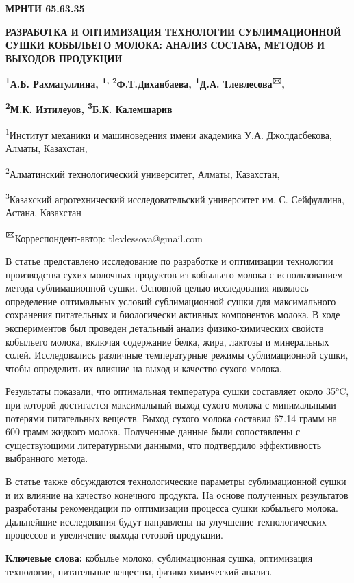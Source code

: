 \newpage
{\bfseries МРНТИ 65.63.35}

{\bfseries РАЗРАБОТКА И ОПТИМИЗАЦИЯ ТЕХНОЛОГИИ СУБЛИМАЦИОННОЙ СУШКИ
КОБЫЛЬЕГО МОЛОКА: АНАЛИЗ СОСТАВА, МЕТОДОВ И ВЫХОДОВ ПРОДУКЦИИ}

{\bfseries \textsuperscript{1}А.Б. Рахматуллина, \textsuperscript{1,
2}Ф.Т.Диханбаева, \textsuperscript{1}Д.А.
Тлевлесова\textsuperscript{🖂},}

{\bfseries \textsuperscript{2}М.К. Изтилеуов, \textsuperscript{3}Б.К.
Калемшарив}

\textsuperscript{1}Институт механики и машиноведения имени академика
У.А. Джолдасбекова, Алматы, Казахстан,

\textsuperscript{2}Алматинский технологический университет, Алматы,
Казахстан,

\textsuperscript{3}Казахский агротехнический исследовательский
университет им. С. Сейфуллина, Астана, Казахстан

{\bfseries \textsuperscript{🖂}}Корреспондент-автор: tlevlessova@gmail.com

В статье представлено исследование по разработке и оптимизации
технологии производства сухих молочных продуктов из кобыльего молока с
использованием метода сублимационной сушки. Основной целью исследования
являлось определение оптимальных условий сублимационной сушки для
максимального сохранения питательных и биологически активных компонентов
молока. В ходе экспериментов был проведен детальный анализ
физико-химических свойств кобыльего молока, включая содержание белка,
жира, лактозы и минеральных солей. Исследовались различные температурные
режимы сублимационной сушки, чтобы определить их влияние на выход и
качество сухого молока.

Результаты показали, что оптимальная температура сушки составляет около
35°C, при которой достигается максимальный выход сухого молока с
минимальными потерями питательных веществ. Выход сухого молока составил
67.14 грамм на 600 грамм жидкого молока. Полученные данные были
сопоставлены с существующими литературными данными, что подтвердило
эффективность выбранного метода.

В статье также обсуждаются технологические параметры сублимационной
сушки и их влияние на качество конечного продукта. На основе полученных
результатов разработаны рекомендации по оптимизации процесса сушки
кобыльего молока. Дальнейшие исследования будут направлены на улучшение
технологических процессов и увеличение выхода готовой продукции.

{\bfseries Ключевые слова:} кобылье молоко, сублимационная сушка,
оптимизация технологии, питательные вещества, физико-химический анализ.

